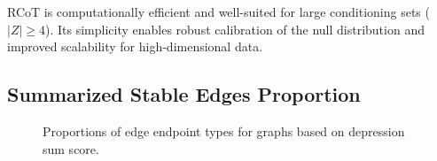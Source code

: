\documentclass[
]{article}
\begin{document}
RCoT is computationally efficient and well-suited for large conditioning
sets (\(|Z| \geq 4\)). Its simplicity enables robust calibration of the
null distribution and improved scalability for high-dimensional data.

\subsection{Summarized Stable Edges Proportion}\label{sec-propmatrix}

\begin{figure}


\caption{\label{fig-sum-mat}Proportions of edge endpoint types for
graphs based on depression sum score.}

\end{figure}%
\end{document}

